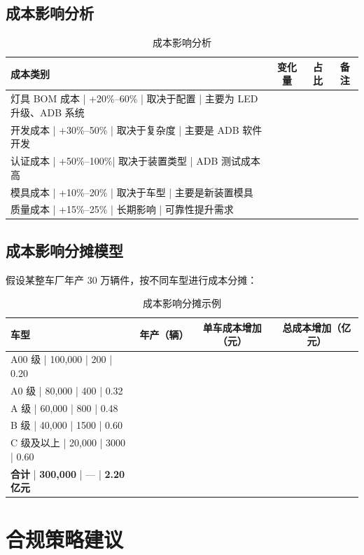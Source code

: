 \subsection{成本影响分析}

\begin{table}[H]
\centering
\caption{成本影响分析}
\begin{tabular}{|l|c|c|c|}
\hline
\textbf{成本类别} & \textbf{变化量} & \textbf{占比} & \textbf{备注} \\
\hline
灯具 BOM 成本   | +20\%--60\% | 取决于配置 | 主要为 LED 升级、ADB 系统 \\
\hline
开发成本      | +30\%--50\% | 取决于复杂度 | 主要是 ADB 软件开发 \\
\hline
认证成本      | +50\%--100\%| 取决于装置类型 | ADB 测试成本高 \\
\hline
模具成本      | +10\%--20\% | 取决于车型  | 主要是新装置模具 \\
\hline
质量成本      | +15\%--25\% | 长期影响    | 可靠性提升需求 \\
\hline
\end{tabular}
\end{table}

\subsection{成本影响分摊模型}

假设某整车厂年产 30 万辆件，按不同车型进行成本分摊：

\begin{table}[H]
\centering
\caption{成本影响分摊示例}
\begin{tabular}{|l|c|c|c|}
\hline
\textbf{车型} & \textbf{年产（辆）} & \textbf{单车成本增加（元）} & \textbf{总成本增加（亿元）} \\
\hline
A00 级       | 100,000 | 200       | 0.20 \\
\hline
A0 级        | 80,000  | 400       | 0.32 \\
\hline
A 级         | 60,000  | 800       | 0.48 \\
\hline
B 级         | 40,000  | 1500      | 0.60 \\
\hline
C 级及以上     | 20,000  | 3000      | 0.60 \\
\hline
\textbf{合计} | \textbf{300,000} | --- | \textbf{2.20 亿元} \\
\hline
\end{tabular}
\end{table}

\section{合规策略建议}

